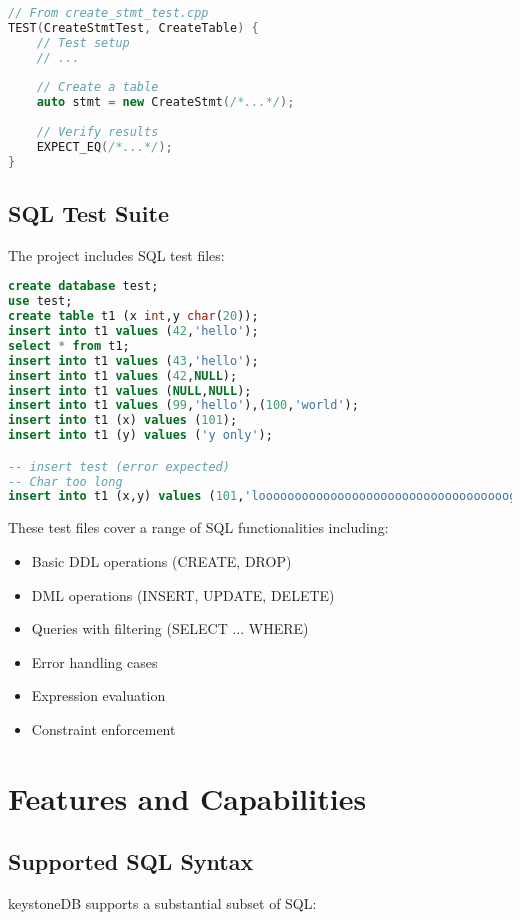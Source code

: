 \documentclass[12pt,a4paper]{article}
\begin{document}
\begin{lstlisting}[language=C++,caption=Example of a unit test for CreateStmt]
// From create_stmt_test.cpp
TEST(CreateStmtTest, CreateTable) {
    // Test setup
    // ...
    
    // Create a table
    auto stmt = new CreateStmt(/*...*/);
    
    // Verify results
    EXPECT_EQ(/*...*/);
}
\end{lstlisting}

\subsection{SQL Test Suite}
The project includes SQL test files:

\begin{lstlisting}[language=SQL,caption=Excerpt from test.sql]
create database test;
use test;
create table t1 (x int,y char(20));
insert into t1 values (42,'hello');
select * from t1;
insert into t1 values (43,'hello');
insert into t1 values (42,NULL);
insert into t1 values (NULL,NULL);
insert into t1 values (99,'hello'),(100,'world');
insert into t1 (x) values (101);
insert into t1 (y) values ('y only');

-- insert test (error expected)
-- Char too long
insert into t1 (x,y) values (101,'looooooooooooooooooooooooooooooooooog');
\end{lstlisting}

These test files cover a range of SQL functionalities including:
\begin{itemize}
    \item Basic DDL operations (CREATE, DROP)
    \item DML operations (INSERT, UPDATE, DELETE)
    \item Queries with filtering (SELECT ... WHERE)
    \item Error handling cases
    \item Expression evaluation
    \item Constraint enforcement
\end{itemize}

\section{Features and Capabilities}
\subsection{Supported SQL Syntax}
keystoneDB supports a substantial subset of SQL:
\end{document}
